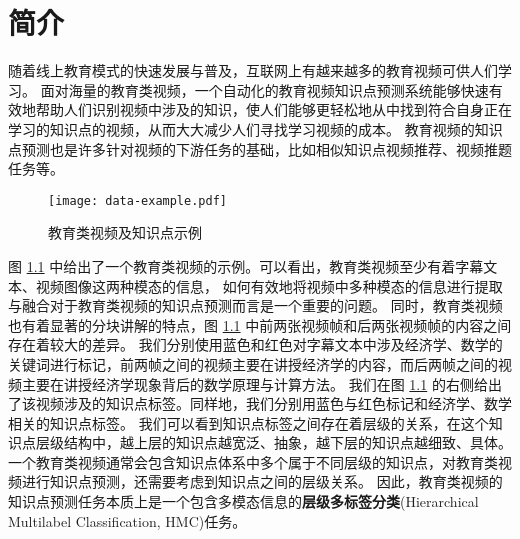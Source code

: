 
\chapter{简介}
    随着线上教育模式的快速发展与普及，互联网上有越来越多的教育视频可供人们学习。
    面对海量的教育类视频，一个自动化的教育视频知识点预测系统能够快速有效地帮助人们识别视频中涉及的知识，使人们能够更轻松地从中找到符合自身正在学习的知识点的视频，从而大大减少人们寻找学习视频的成本。
    教育视频的知识点预测也是许多针对视频的下游任务的基础，比如相似知识点视频推荐、视频推题任务等。

    \begin{figure}[t]
        \centering
        \texttt{[image: data-example.pdf]}
        \caption{教育类视频及知识点示例}
        \label{fig1.1}
    \end{figure}

    图 \ref{fig1.1} 中给出了一个教育类视频的示例。可以看出，教育类视频至少有着字幕文本、视频图像这两种模态的信息，
    如何有效地将视频中多种模态的信息进行提取与融合对于教育类视频的知识点预测而言是一个重要的问题。
    同时，教育类视频也有着显著的分块讲解的特点，图 \ref{fig1.1} 中前两张视频帧和后两张视频帧的内容之间存在着较大的差异。
    我们分别使用蓝色和红色对字幕文本中涉及经济学、数学的关键词进行标记，前两帧之间的视频主要在讲授经济学的内容，而后两帧之间的视频主要在讲授经济学现象背后的数学原理与计算方法。
    我们在图 \ref{fig1.1} 的右侧给出了该视频涉及的知识点标签。同样地，我们分别用蓝色与红色标记和经济学、数学相关的知识点标签。
    我们可以看到知识点标签之间存在着层级的关系，在这个知识点层级结构中，越上层的知识点越宽泛、抽象，越下层的知识点越细致、具体。
    一个教育类视频通常会包含知识点体系中多个属于不同层级的知识点，对教育类视频进行知识点预测，还需要考虑到知识点之间的层级关系。
    因此，教育类视频的知识点预测任务本质上是一个包含多模态信息的\textbf{层级多标签分类}(Hierarchical Multilabel Classification, HMC)任务。

